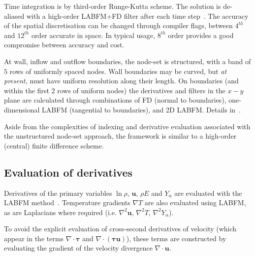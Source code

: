 \documentclass[notitlepage]{revtex4-1}
\begin{document}
Time integration is by third-order Runge-Kutta scheme. The solution is de-aliased with a high-order LABFM+FD filter after each time step~\cite{king_labfm_2022}. The accuracy of the spatial discretisation can be changed through compiler flags, between $4^{th}$ and $12^{th}$ order accurate in space. In typical usage, $8^{th}$ order provides a good compromise between accuracy and cost.

At wall, inflow and outflow boundaries, the node-set is structured, with a band of $5$ rows of uniformly spaced nodes. Wall boundaries may be curved, but \emph{at present,} must have uniform resolution along their length. On boundaries (and within the first $2$ rows of uniform nodes) the derivatives and filters in the $x-y$ plane are calculated through combinations of FD (normal to boundaries), one-dimensional LABFM (tangential to boundaries), and 2D LABFM. Details in~\cite{king_labfm_2022}.

Aside from the complexities of indexing and derivative evaluation associated with the unstructured node-set approach, the framework is similar to a high-order (central) finite difference scheme.

\subsection{Evaluation of derivatives}

Derivatives of the primary variables $\ln\rho$, $\bm{u}$, $\rho{E}$ and $Y_{\alpha}$ are evaluated with the LABFM method~\cite{king_labfm_2022}. Temperature gradients $\nabla{T}$ are also evaluated using LABFM, as are Laplacians where required (i.e. $\nabla^{2}\bm{u}$, $\nabla^{2}{T}$, $\nabla^{2}Y_{\alpha}$). 

To avoid the explicit evaluation of cross-second derivatives of velocity (which appear in the terms $\nabla\cdot\bm{\tau}$ and $\nabla\cdot\left(\bm{\tau}\bm{u}\right)$), these terms are constructed by evaluating the gradient of the velocity divergence $\nabla\cdot\bm{u}$.
\end{document}
